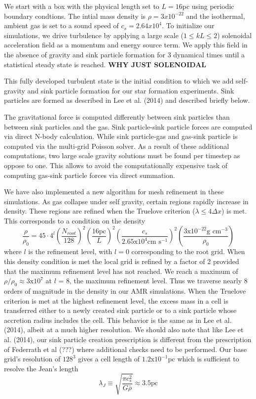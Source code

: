 \documentclass{emulateapj}
\newcommand{\be}{\begin{equation}}
\newcommand{\ee}{\end{equation}}
\begin{document}
We start with a box with the physical length set to $L = 16$pc using periodic boundary condtions. The intial mass density is $\rho = 3x10^{-22}$ and the isothermal, ambient gas is set to a sound speed of $c_s = 2.64x10^{4}$. To initialize our simulations, we drive turbulence by applying a large scale ($1 \le kL \le 2$) solenoidal acceleration field as a momentum and energy source term. We apply this field in the absence of gravity and sink particle formation for 3 dynamical times until a statistical steady state is reached.
{\bf WHY JUST SOLENOIDAL}

This fully developed turbulent state is the initial condition to which we add self-gravity and sink particle formation for our star formation experiments. Sink particles are formed as described in Lee et al. (2014) and described briefly below.  

The gravitational force is computed differently between sink particles than between sink particles and the gas. Sink particle-sink particle forces are computed via direct N-body calculation. While sink particle-gas and gas-sink particle is computed via the multi-grid Poisson solver. As a result of these additional computations, two large scale gravity solutions must be found per timestep as oppose to one. This allows to avoid the computationally expensive task of computing gas-sink particle forces via direct summation.

We have also implemented a new algorithm for mesh refinement in these simulations. As gas collapse under self gravity, certain regions rapidly increase in density. These regions are refined when the Truelove criterion ($\lambda \le 4 \Delta x$) is met. This corresponds to a condition on the density 
\be
\frac{\rho}{\rho_{0}} = 45 \cdot 4^{l} \left( \frac{N_{root}}{128} \right)^2 \left( \frac{16 \text{pc}}{L} \right)^2 \left( \frac{c_{s}}{2.65\text{x}10^4 \text{cm s$^{-1}$}} \right)^2 \left( \frac{3 \text{x}10^{-22} \text{g cm$^{-3}$}}{\rho_{0}} \right)
\label{eq:refinement_criteria}
\ee
 where $l$ is the refinement level, with $l = 0$ corresponding to the root grid. When this density condition is met the local grid is refined by a factor of 2 provided that the maximum refinement level has not reached. 
We reach a maximum of $\rho / \rho_{0} \approx 3 \text{x} 10^{7}$ at $l$ = 8, the maximum refinement level. Thus we traverse nearly 8 orders of magnitude in the density in our AMR simulations.
When the Truelove criterion is met at the highest refinement level, the excess mass in a cell is transferred either to a newly created sink particle or to a sink particle whose accretion radius includes the cell. This behavior is the same as in Lee et al. (2014), albeit at a much higher resolution. We should also note that like Lee et al. (2014), our sink particle creation prescription is different from the prescription of Federrath et al (???) where additional checks need to be performed.
Our base grid's resolution of $128^3$ gives a cell length of $1.2 \text{x} 10^{-1}$pc which is sufficient to resolve the Jean's length
\be
\lambda_J \equiv \sqrt{\frac{\pi c_{s}^2}{G \bar{\rho}}} \approx 3.5 \text{pc}
\ee
\end{document}
